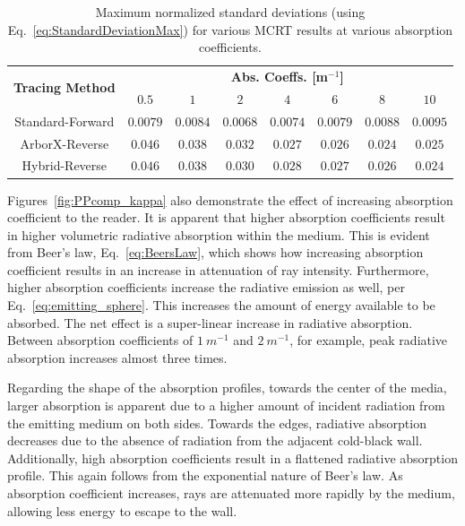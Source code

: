 \begin{table}
\centering
\caption{Maximum normalized standard deviations (using Eq.~\ref{eq:StandardDeviationMax}) for various MCRT results at various absorption coefficients.}
\begin{tabular}{c c c c c c c c} 
\hline
\multirow{ 2}{*}{\bfseries Tracing Method} & 
\multicolumn{7}{c}{\bfseries Abs. Coeffs. [m$^{-1}$]} \\ [0.5ex] \cline{2-8}
 & $0.5$ & $1$ & $2$ & $4$ & $6$ & $8$ & $10$\\ [0.5ex]
 \hline
 Standard-Forward & $0.0079$ & $0.0084$ & $0.0068$ & $0.0074$ & $0.0079$ & $0.0088$ & $0.0095$\\ [0.5ex] 
 ArborX-Reverse & $0.046$ & $0.038$ & $0.032$ & $0.027$ & $0.026$ & $0.024$ & $0.025$\\ [0.5ex] 
 Hybrid-Reverse & $0.046$ & $0.038$ & $0.030$ & $0.028$ & $0.027$ & $0.026$ & $0.024$\\ [0.5ex] 
 \hline
\end{tabular}
\label{table:PPcomp_std}
\end{table}

Figures~\ref{fig:PPcomp_kappa} also demonstrate the effect of increasing absorption coefficient to the reader. It is apparent that higher absorption coefficients result in higher volumetric radiative absorption within the medium. 
This is evident from Beer's law, Eq.~\ref{eq:BeersLaw}, which shows how increasing absorption coefficient results in an increase in attenuation of ray intensity.
Furthermore, higher absorption coefficients increase the radiative emission as well, per Eq.~\ref{eq:emitting_sphere}. This increases the amount of energy available to be absorbed. The net effect is a super-linear increase in radiative absorption. Between absorption coefficients of $1~m^{-1}$ and $2~m^{-1}$, for example, peak radiative absorption increases almost three times.

Regarding the shape of the absorption profiles, towards the center of the media, larger absorption is apparent due to a higher amount of incident radiation from the emitting medium on both sides.
Towards the edges, radiative absorption decreases due to the absence of radiation from the adjacent cold-black wall. Additionally, high absorption coefficients result in a flattened radiative absorption profile. This again follows from the exponential nature of Beer's law. As absorption coefficient increases, rays are attenuated more rapidly by the medium, allowing less energy to escape to the wall.

